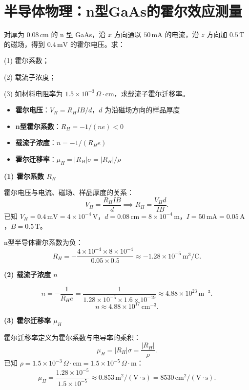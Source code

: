 \section{半导体物理：n型GaAs的霍尔效应测量}
\label{sec:gaas-hall-effect}

\begin{modelbox}[题目：n型GaAs霍尔系数与迁移率]
对厚为 $0.08\,\text{cm}$ 的 n 型 GaAs，沿 $x$ 方向通以 $50\,\text{mA}$ 的电流，沿 $z$ 方向加 $0.5\,\text{T}$ 的磁场，得到 $0.4\,\text{mV}$ 的霍尔电压。求：

(1) 霍尔系数；

(2) 载流子浓度；

(3) 如材料电阻率为 $1.5\times10^{-3}\,\Omega\cdot\text{cm}$，求载流子霍尔迁移率。
\end{modelbox}

\begin{tipbox}[考点快速分析]
\begin{itemize}
    \item \textbf{霍尔电压}：$V_H=R_HIB/d$，$d$ 为沿磁场方向的样品厚度
    \item \textbf{n型霍尔系数}：$R_H=-1/(ne)<0$
    \item \textbf{载流子浓度}：$n=-1/(R_He)$
    \item \textbf{霍尔迁移率}：$\mu_H=|R_H|\sigma=|R_H|/\rho$
\end{itemize}
\end{tipbox}

\begin{derivationbox}[标准解题过程]
\textbf{(1) 霍尔系数 $R_H$}

霍尔电压与电流、磁场、样品厚度的关系：
\[
V_H=\frac{R_HIB}{d}\implies R_H=\frac{V_Hd}{IB}.
\]
已知 $V_H=0.4\,\text{mV}=4\times10^{-4}\,\text{V}$，$d=0.08\,\text{cm}=8\times10^{-4}\,\text{m}$，$I=50\,\text{mA}=0.05\,\text{A}$，$B=0.5\,\text{T}$。

n型半导体霍尔系数为负：
\begin{equation}
\boxed{R_H=-\frac{4\times10^{-4}\times8\times10^{-4}}{0.05\times0.5}\approx-1.28\times10^{-5}\,\text{m}^3/\text{C}.}
\end{equation}

\textbf{(2) 载流子浓度 $n$}

\[
n=-\frac{1}{R_He}=\frac{1}{1.28\times10^{-5}\times1.6\times10^{-19}}\approx4.88\times10^{23}\,\text{m}^{-3}.
\]
\begin{equation}
\boxed{n\approx4.88\times10^{17}\,\text{cm}^{-3}.}
\end{equation}

\textbf{(3) 霍尔迁移率 $\mu_H$}

霍尔迁移率定义为霍尔系数与电导率的乘积：
\[
\mu_H=|R_H|\sigma=\frac{|R_H|}{\rho}.
\]
已知 $\rho=1.5\times10^{-3}\,\Omega\cdot\text{cm}=1.5\times10^{-5}\,\Omega\cdot\text{m}$：
\begin{equation}
\boxed{\mu_H=\frac{1.28\times10^{-5}}{1.5\times10^{-5}}\approx0.853\,\text{m}^2/(\text{V}\cdot\text{s})=8530\,\text{cm}^2/(\text{V}\cdot\text{s}).}
\end{equation}
\end{derivationbox}

